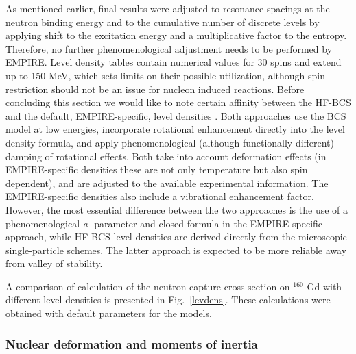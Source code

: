 As mentioned earlier, final results were adjusted to resonance spacings at
the neutron binding energy and to the cumulative number of discrete levels
by applying shift to the excitation energy and a multiplicative factor to
the entropy. Therefore, no further phenomenological adjustment needs to be
performed by EMPIRE. Level density tables contain numerical values for 30
spins and extend up to 150 MeV, which sets limits on their possible
utilization, although spin restriction should not be an issue for nucleon
induced reactions. Before concluding this section we would like to note
certain affinity between the HF-BCS%
 and the default, EMPIRE-specific, level densities%
. Both approaches use the BCS%
 model at low energies, incorporate rotational enhancement
directly into the level density formula, and apply phenomenological
(although functionally different) damping of rotational effects. Both take
into account deformation effects (in EMPIRE-specific densities these are not
only temperature but also spin dependent), and are adjusted to the available
experimental information. The EMPIRE-specific densities also include a
vibrational enhancement factor. However, the most essential difference
between the two approaches is the use of a phenomenological \emph{a}%
-parameter and closed formula in the EMPIRE-specific approach, while HF-BCS%
 level densities%
 are derived directly from the microscopic
single-particle schemes. The latter approach is expected to be more reliable
away from valley of stability.

A comparison of calculation of the neutron capture cross section on $^{160}$%
Gd with different level densities is presented in Fig.~\ref{levdens}. These
calculations were obtained with default parameters for the models.

\subsubsection{Nuclear deformation and moments of inertia\label{sec: defor}}

